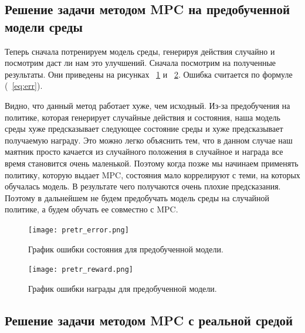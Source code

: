 \subsection{Решение задачи методом MPC на предобученной модели среды}\label{1sec:optimal-control}

Теперь сначала потренируем модель среды, генерируя действия случайно и посмотрим даст ли нам это улучшений. Сначала посмотрим на полученные результаты. Они приведены на рисунках ~\ref{fig:pretr-err} и ~\ref{fig:pretr-reward}. Ошибка считается по формуле (~\ref{eq:err}). 

Видно, что данный метод работает хуже, чем исходный. Из-за предобучения на политике, которая генерирует случайные действия и состояния, наша модель среды хуже предсказывает следующее состояние среды и хуже предсказывает получаемую награду. Это можно легко объяснить тем, что в данном случае наш маятник просто качается из случайного положения в случайное и награда все время становится очень маленькой. Поэтому когда позже мы начинаем применять политику, которую выдает MPC, состояния мало коррелируют с теми, на которых обучалась модель. В результате чего получаются очень плохие предсказания. Поэтому в дальнейшем не будем предобучать модель среды на случайной политике, а будем обучать ее совместно с MPC.

\newpage


\begin{figure}[!htb]
	\centering
	\texttt{[image: pretr\_error.png]}
	\caption {График ошибки состояния для предобученной модели. }
	\label{fig:pretr-err}
\end{figure}


\begin{figure}[!htb]
	\centering
	\texttt{[image: pretr\_reward.png]}
	\caption {График ошибки награды для предобученной модели. }
	\label{fig:pretr-reward}
\end{figure}


\subsection{Решение задачи методом MPC с реальной средой}\label{1sec:optimal-control}

